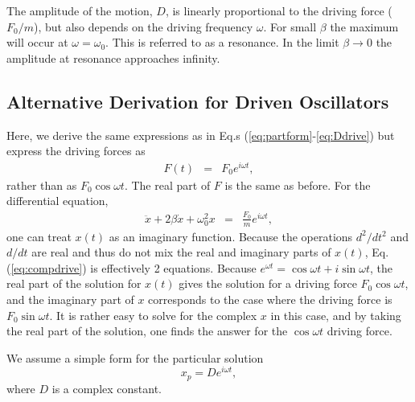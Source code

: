 The amplitude of the motion, $D$, is linearly proportional to the driving force ($F_0/m$), but also depends on the driving frequency $\omega$. For small $\beta$ the maximum will occur at $\omega=\omega_0$. This is referred to as a resonance. In the limit $\beta\rightarrow 0$ the amplitude at resonance approaches infinity. 

\subsection{Alternative Derivation for Driven Oscillators}

Here, we derive the same expressions as in Eq.s (\ref{eq:partform}-\ref{eq:Ddrive}) but express the driving forces as
\begin{eqnarray}
F(t)&=&F_0e^{i\omega t},
\end{eqnarray}
rather than as $F_0\cos\omega t$. The real part of $F$ is the same as before. For the differential equation,
\begin{eqnarray}
\label{eq:compdrive}
\ddot{x}+2\beta\dot{x}+\omega_0^2x&=&\frac{F_0}{m}e^{i\omega t},
\end{eqnarray}
one can treat $x(t)$ as an imaginary function. Because the operations $d^2/dt^2$ and $d/dt$ are real and thus do not mix the real and imaginary parts of $x(t)$, Eq. (\ref{eq:compdrive}) is effectively 2 equations. Because $e^{\omega t}=\cos\omega t+i\sin\omega t$, the real part of the solution for $x(t)$ gives the solution for a driving force $F_0\cos\omega t$, and the imaginary part of $x$ corresponds to the case where the driving force is $F_0\sin\omega t$. It is rather easy to solve for the complex $x$ in this case, and by taking the real part of the solution, one finds the answer for the $\cos\omega t$ driving force.

We assume a simple form for the particular solution
\begin{equation}
x_p=De^{i\omega t},
\end{equation}
where $D$ is a complex constant.

